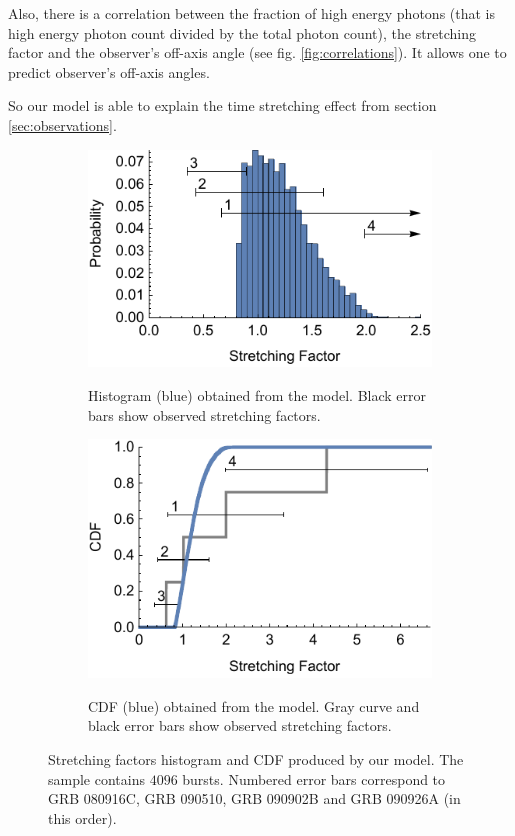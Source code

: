 \documentclass{article}
\begin{document}
	Also, there is a correlation between the fraction of high energy photons (that is high energy photon count divided by the total photon count), the stretching factor and the observer's off-axis angle (see fig. \ref{fig:correlations}).
	It allows one to predict observer's off-axis angles.

	So our model is able to explain the time stretching effect from section \ref{sec:observations}.

\begin{figure}
	\hspace*{\fill}
	\begin{subfigure}{0.45\textwidth}
		\includegraphics[width=\textwidth]{kappaDistributionHistogram}
		\label{fig:kappaDistributionHistogram}
		\caption{Histogram (blue) obtained from the model. Black error bars show observed stretching factors.}
	\end{subfigure}
	\hfill
	\begin{subfigure}{0.45\textwidth}
		\includegraphics[width=\textwidth]{kappaDistributionCDF}
		\label{fig:kappaDistributionCDF}
		\caption{CDF (blue) obtained from the model. Gray curve and black error bars show observed stretching factors.}
	\end{subfigure}
	\hspace*{\fill}
	\caption{
		Stretching factors histogram and CDF produced by our model.
		The sample contains $4096$ bursts.
		Numbered error bars correspond to GRB 080916C, GRB 090510, GRB 090902B and GRB 090926A (in this order).
	}
	\label{fig:kappaDistribution}
\end{figure}
\end{document}

